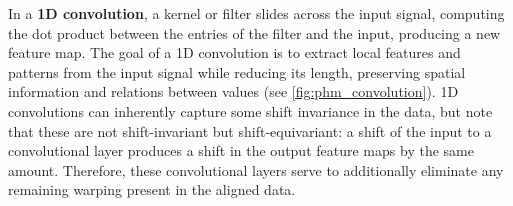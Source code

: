 In a \textbf{1D convolution}, a kernel or filter slides across the input signal, computing the dot product between the entries of the filter and the input, producing a new feature map. The goal of a 1D convolution is to extract local features and patterns from the input signal while reducing its length, preserving spatial information and relations between values (see \cref{fig:phm_convolution}). 1D convolutions can inherently capture some shift invariance in the data, but note that these are not shift-invariant but shift-equivariant: a shift of the input to a convolutional layer produces a shift in the output feature maps by the same amount. Therefore, these convolutional layers serve to additionally eliminate any remaining warping present in the aligned data.

\begin{figure}[!htb]
    \begin{center}
\end{center}
\end{figure}
